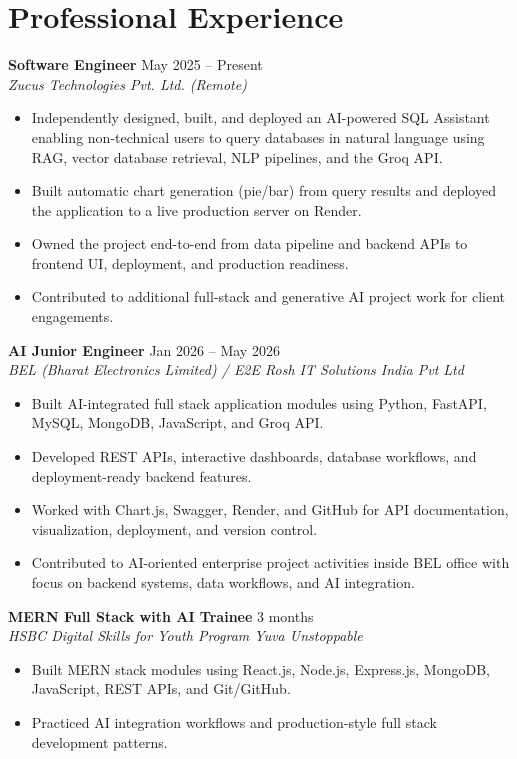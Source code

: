 \documentclass[a4paper,10pt]{article}
\newcommand{\entryspace}{\vspace{5pt}}
\begin{document}
\section*{Professional Experience}
\textbf{Software Engineer} \hfill May 2025 -- Present \\
\textit{Zucus Technologies Pvt. Ltd. (Remote)}
\begin{itemize}
    \item Independently designed, built, and deployed an AI-powered SQL Assistant enabling non-technical users to query databases in natural language using RAG, vector database retrieval, NLP pipelines, and the Groq API.
    \item Built automatic chart generation (pie/bar) from query results and deployed the application to a live production server on Render.
    \item Owned the project end-to-end from data pipeline and backend APIs to frontend UI, deployment, and production readiness.
    \item Contributed to additional full-stack and generative AI project work for client engagements.
\end{itemize}

\entryspace
\textbf{AI Junior Engineer} \hfill Jan 2026 -- May 2026 \\
\textit{BEL (Bharat Electronics Limited) / E2E Rosh IT Solutions India Pvt Ltd}
\begin{itemize}
    \item Built AI-integrated full stack application modules using Python, FastAPI, MySQL, MongoDB, JavaScript, and Groq API.
    \item Developed REST APIs, interactive dashboards, database workflows, and deployment-ready backend features.
    \item Worked with Chart.js, Swagger, Render, and GitHub for API documentation, visualization, deployment, and version control.
    \item Contributed to AI-oriented enterprise project activities inside BEL office with focus on backend systems, data workflows, and AI integration.
\end{itemize}

\entryspace
\textbf{MERN Full Stack with AI Trainee} \hfill 3 months \\
\textit{HSBC Digital Skills for Youth Program \textbar{} Yuva Unstoppable}
\begin{itemize}
    \item Built MERN stack modules using React.js, Node.js, Express.js, MongoDB, JavaScript, REST APIs, and Git/GitHub.
    \item Practiced AI integration workflows and production-style full stack development patterns.
\end{itemize}
\end{document}
